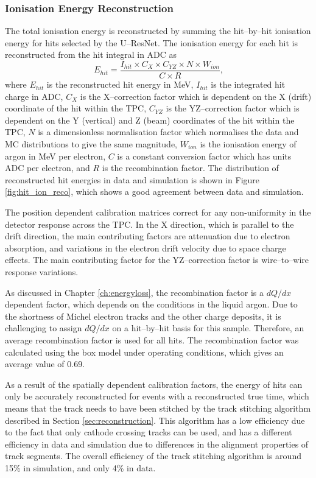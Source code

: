 \subsubsection{Ionisation Energy Reconstruction}

The total ionisation energy is reconstructed by summing the hit--by--hit
ionisation energy for hits selected by the U--ResNet. The ionisation energy for
each hit is reconstructed from the hit integral in ADC as
\begin{equation*}
	E_{hit} = \frac{I_{hit} \times C_X \times C_{YZ} \times N \times W_{ion}}{C \times R}\mbox{,}
\end{equation*}
where $E_{hit}$ is the reconstructed hit energy in MeV, $I_{hit}$ is the
integrated hit charge in ADC, $C_X$ is the X--correction factor which is
dependent on the X (drift) coordinate of the hit within the TPC, $C_{YZ}$ is the
YZ--correction factor which is dependent on the Y (vertical) and Z (beam) 
coordinates of the hit within the TPC, $N$ is a dimensionless normalisation 
factor which normalises the data and MC distributions to give the same 
magnitude, $W_{ion}$ is the ionisation energy of argon in MeV per electron, 
$C$ is a constant conversion factor which has units ADC per electron, and $R$ 
is the recombination factor. The distribution of reconstructed hit energies in 
\protodune{} data and simulation is shown in Figure \ref{fig:hit_ion_reco}, 
which shows a good agreement between data and simulation.

The position dependent calibration matrices correct for any non-uniformity in 
the detector response across the TPC. In the X direction, which is parallel to 
the drift direction, the main contributing factors are attenuation due to 
electron absorption, and variations in the electron drift velocity due to 
space charge effects. The main contributing factor for the YZ--correction 
factor is wire--to--wire response variations.

As discussed in Chapter \ref{ch:energyloss}, the recombination factor is a
$dQ/dx$ dependent factor, which depends on the conditions in the liquid
argon. Due to the shortness of Michel electron tracks and the other charge
deposits, it is challenging to assign $dQ/dx$ on a hit--by--hit basis for this
sample. Therefore, an average recombination factor is used for all hits. The
recombination factor was calculated using the box model\cite{Acciarri2013a}
under \protodune{} operating conditions, which gives an average value of 0.69.

As a result of the spatially dependent calibration factors, the energy of hits
can only be accurately reconstructed for events with a reconstructed true
time, which means that the track needs to have been stitched by the track
stitching algorithm described in Section \ref{sec:reconstruction}. This 
algorithm has a low efficiency due to the fact that only cathode crossing 
tracks can be used, and has a different efficiency in data and simulation due 
to differences in the alignment properties of track segments. The overall 
efficiency of the track stitching algorithm is around 15\% in simulation, and 
only 4\% in data.

